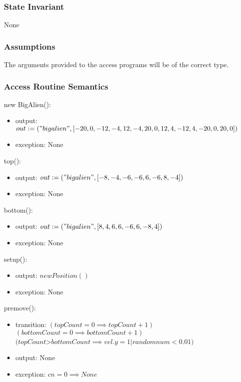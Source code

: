 \documentclass[12pt]{article}
\begin{document}
\subsubsection* {State Invariant}
None

\subsubsection* {Assumptions}

The arguments provided to the access programs will be of the correct type.

\subsubsection* {Access Routine Semantics}

\noindent new BigAlien():
\begin{itemize} 
\item output: $out := ("bigalien",[-20,0,-12,-4,12,-4,20, 0, 12, 4,-12 ,4, -20, 0, 20 ,0])$
\item exception: None
\end{itemize}

\noindent top():
\begin{itemize} 
\item output: $out := ("bigalien",[-8,-4,-6,-6,6,-6,8,-4])$
\item exception: None
\end{itemize}

\noindent bottom():
\begin{itemize} 
\item output: $out := ("bigalien",[8,4,6,6,-6,6,-8,4])$
\item exception: None
\end{itemize}



\noindent setup():
\begin{itemize} 
\item output: $newPosition()$
\item exception: None
\end{itemize}


\noindent premove():
\begin{itemize} 
\item transition: $(topCount = 0 \implies topCount + 1)$\\
$(bottomCount = 0 \implies bottomCount + 1)$\\
$(topCount $>$ bottomCount \implies vel.y = 1 | randomnum < 0.01)$\\
\item output: None
\item exception: $cn = 0 \implies None$
\end{itemize}
\end{document}
